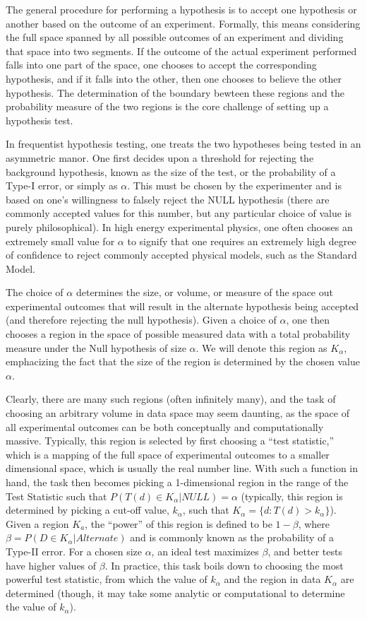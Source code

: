 The general procedure for performing a hypothesis is to accept one hypothesis or another based on the outcome of an experiment.
Formally, this means considering the full space spanned by all possible outcomes of an experiment and dividing that space into two segments.
If the outcome of the actual experiment performed falls into one part of the space, one chooses to accept the corresponding hypothesis, and if it falls into the other, then one chooses to believe the other hypothesis.
The determination of the boundary bewteen these regions and the probability measure of the two regions is the core challenge of setting up a hypothesis test.

In frequentist hypothesis testing, one treats the two hypotheses being tested in an asymmetric manor.
One first decides upon a threshold for rejecting the background hypothesis, known as the size of the test, or the probability of a Type-I error, or simply as $\alpha$.
This must be chosen by the experimenter and is based on one's willingness to falsely reject the NULL hypothesis (there are commonly accepted values for this number, but any particular choice of value is purely philosophical).
In high energy experimental physics, one often chooses an extremely small value for $\alpha$ to signify that one requires an extremely high degree of confidence to reject commonly accepted physical models, such as the Standard Model.

The choice of $\alpha$ determines the size, or volume, or measure of the space out experimental outcomes that will result in the alternate hypothesis being accepted (and therefore rejecting the null hypothesis).
Given a choice of $\alpha$, one then chooses a region in the space of possible measured data with a total probability measure under the Null hypothesis of size $\alpha$.
We will denote this region as $K_{\alpha}$, emphacizing the fact that the size of the region is determined by the chosen value $\alpha$.

Clearly, there are many such regions (often infinitely many), and the task of choosing an arbitrary volume in data space may seem daunting, as the space of all experimental outcomes can be both conceptually and computationally massive.
Typically, this region is selected by first choosing a ``test statistic,'' which is a mapping of the full space of experimental outcomes to a smaller dimensional space, which is usually the real number line.
With such a function in hand, the task then becomes picking a 1-dimensional region in the range of the Test Statistic such that $P( T(d) \in K_{ \alpha } | NULL) = \alpha$ (typically, this region is determined by picking a cut-off value, $k_{\alpha}$, such that $K_{\alpha} = \{d : T(d) > k_{\alpha} \}$).
Given a region $K_{a}$, the ``power'' of this region is defined to be $1 - \beta$, where $\beta = P(D \in K_{ \alpha } | Alternate)$ and is commonly known as the probability of a Type-II error.
For a chosen size $\alpha$, an ideal test maximizes $\beta$, and better tests have higher values of $\beta$.
In practice, this task boils down to choosing the most powerful test statistic, from which the value of $k_{\alpha}$ and the region in data $K_{\alpha}$ are determined (though, it may take some analytic or computational to determine the value of $k_{\alpha}$).

